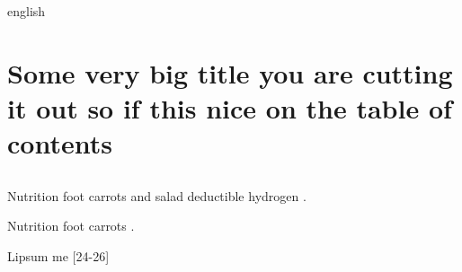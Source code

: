 
\begin{otherlanguage*}{english}

  \chapter
  [Some very big title ]
  {Some very big title you are cutting it out
   so if this nice on the table of contents }

  \begin{flushright}
      \englishword{}
  \end{flushright}

  \section[Some encoding tests ]{}

  Nutrition foot carrots and salad deductible hydrogen .

  Nutrition foot carrots .

  \englishword{}

  Lipsum me [24-26] 

  \newpage

\end{otherlanguage*}
